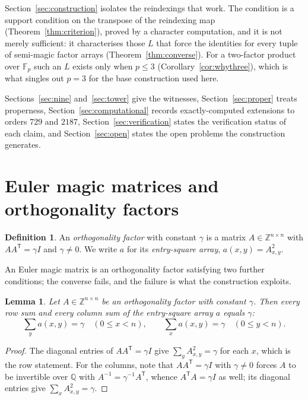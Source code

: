 \documentclass[11pt,a4paper]{amsart}
\theoremstyle{plain}
\newtheorem{lemma}[theorem]{Lemma}
\theoremstyle{definition}
\newtheorem{definition}[theorem]{Definition}
\theoremstyle{remark}
\newcommand{\FF}{\mathbb{F}}
\newcommand{\ZZ}{\mathbb{Z}}
\newcommand{\tr}{\mathsf{T}}
\begin{document}
Section~\ref{sec:construction} isolates the reindexings that work. The condition
is a support condition on the transpose of the reindexing map
(Theorem~\ref{thm:criterion}), proved by a character computation, and it is not
merely sufficient: it characterises those $L$ that force the identities for
every tuple of semi-magic factor arrays (Theorem~\ref{thm:converse}). For a
two-factor product over $\FF_p$ such an $L$ exists only when $p\le3$
(Corollary~\ref{cor:whythree}), which is what singles out $p=3$ for the base
construction used here.

Sections~\ref{sec:nine} and~\ref{sec:tower} give the witnesses,
Section~\ref{sec:proper} treats properness, Section~\ref{sec:computational}
records exactly-computed extensions to orders $729$ and $2187$,
Section~\ref{sec:verification} states the verification status of each claim,
and Section~\ref{sec:open} states the open problems the construction generates.

\section{Euler magic matrices and orthogonality factors}\label{sec:prelim}

\begin{definition}\label{def:factor}
An \emph{orthogonality factor} with constant $\gamma$ is a matrix
$A\in\ZZ^{n\times n}$ with $AA^{\tr}=\gamma I$ and $\gamma\ne0$. We write
$a$ for its \emph{entry-square array}, $a(x,y)=A_{x,y}^2$.
\end{definition}

An Euler magic matrix is an orthogonality factor satisfying two further
conditions; the converse fails, and the failure is what the construction
exploits.

\begin{lemma}\label{lem:semimagic}
Let $A\in\ZZ^{n\times n}$ be an orthogonality factor with constant $\gamma$.
Then every row sum and every column sum of the entry-square array $a$ equals
$\gamma$:
\[
\sum_{y} a(x,y)=\gamma \quad (0\le x<n),\qquad
\sum_{x} a(x,y)=\gamma \quad (0\le y<n).
\]
\end{lemma}

\begin{proof}
The diagonal entries of $AA^{\tr}=\gamma I$ give
$\sum_y A_{x,y}^2=\gamma$ for each $x$, which is the row statement. For the
columns, note that $AA^{\tr}=\gamma I$ with $\gamma\ne0$ forces $A$ to be
invertible over $\mathbb{Q}$ with $A^{-1}=\gamma^{-1}A^{\tr}$, whence
$A^{\tr}A=\gamma I$ as well; its diagonal entries give
$\sum_x A_{x,y}^2=\gamma$.
\end{proof}
\end{document}
